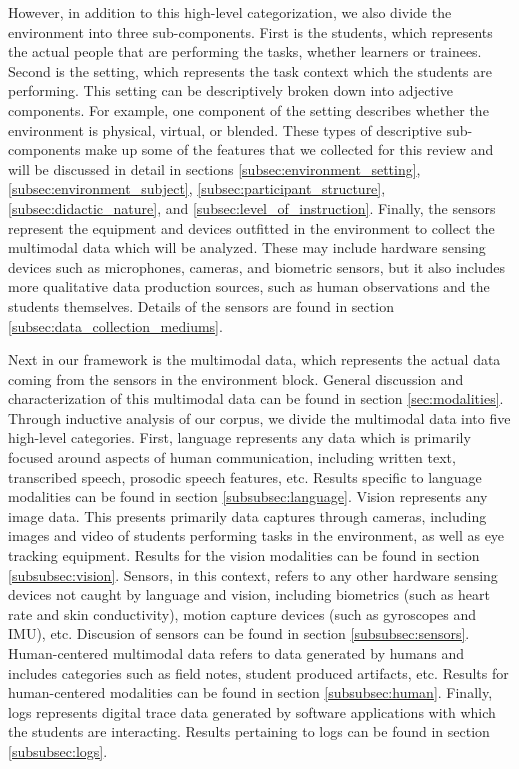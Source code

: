 \documentclass[manuscript,screen,review]{acmart}
\begin{document}
However, in addition to this high-level categorization, we also divide the environment into three sub-components. First is the students, which represents the actual people that are performing the tasks, whether learners or trainees. Second is the setting, which represents the task context which the students are performing. This setting can be descriptively broken down into adjective components. For example, one component of the setting describes whether the environment is physical, virtual, or blended. These types of descriptive sub-components make up some of the features that we collected for this review and will be discussed in detail in sections \ref{subsec:environment_setting}, \ref{subsec:environment_subject}, \ref{subsec:participant_structure}, \ref{subsec:didactic_nature}, and \ref{subsec:level_of_instruction}. Finally, the sensors represent the equipment and devices outfitted in the environment to collect the multimodal data which will be analyzed. These may include hardware sensing devices such as microphones, cameras, and biometric sensors, but it also includes more qualitative data production sources, such as human observations and the students themselves. Details of the sensors are found in section \ref{subsec:data_collection_mediums}.

Next in our framework is the multimodal data, which represents the actual data coming from the sensors in the environment block. General discussion and characterization of this multimodal data can be found in section \ref{sec:modalities}. Through inductive analysis of our corpus, we divide the multimodal data into five high-level categories. First, language represents any data which is primarily focused around aspects of human communication, including written text, transcribed speech, prosodic speech features, etc. Results specific to language modalities can be found in section \ref{subsubsec:language}. Vision represents any image data. This presents primarily data captures through cameras, including images and video of students performing tasks in the environment, as well as eye tracking equipment. Results for the vision modalities can be found in section \ref{subsubsec:vision}. Sensors, in this context, refers to any other hardware sensing devices not caught by language and vision, including biometrics (such as heart rate and skin conductivity), motion capture devices (such as gyroscopes and IMU), etc. Discusion of sensors can be found in section \ref{subsubsec:sensors}. Human-centered multimodal data refers to data generated by humans and includes categories such as field notes, student produced artifacts, etc. Results for human-centered modalities can be found in section \ref{subsubsec:human}. Finally, logs represents digital trace data generated by software applications with which the students are interacting. Results pertaining to logs can be found in section \ref{subsubsec:logs}.
\end{document}
